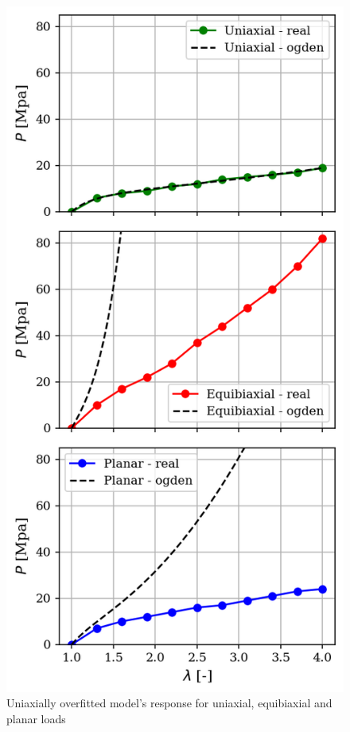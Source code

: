 \documentclass[12pt,a4paper]{article}
\begin{document}
\begin{figure}[h]
    \centering
    \includegraphics[scale=0.8]{figures/uniaxial_fit.png}
    \caption{Uniaxially overfitted model's response for uniaxial, equibiaxial and planar loads}
\end{figure}
\end{document}
